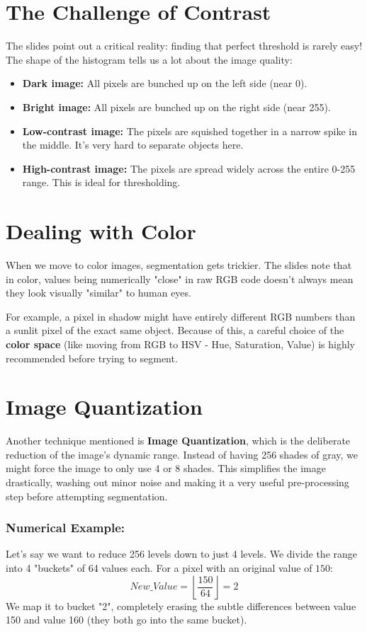 \documentclass{report}
\begin{document}
\section{The Challenge of Contrast}
The slides point out a critical reality: finding that perfect threshold is rarely easy! The shape of the histogram tells us a lot about the image quality:
\begin{itemize}
    \item \textbf{Dark image:} All pixels are bunched up on the left side (near 0).
    \item \textbf{Bright image:} All pixels are bunched up on the right side (near 255).
    \item \textbf{Low-contrast image:} The pixels are squished together in a narrow spike in the middle. It's very hard to separate objects here.
    \item \textbf{High-contrast image:} The pixels are spread widely across the entire 0-255 range. This is ideal for thresholding.
\end{itemize}

\section{Dealing with Color}
When we move to color images, segmentation gets trickier. The slides note that in color, values being numerically "close" in raw RGB code doesn't always mean they look visually "similar" to human eyes.

For example, a pixel in shadow might have entirely different RGB numbers than a sunlit pixel of the exact same object. Because of this, a careful choice of the \textbf{color space} (like moving from RGB to HSV - Hue, Saturation, Value) is highly recommended before trying to segment.

\section{Image Quantization}
Another technique mentioned is \textbf{Image Quantization}, which is the deliberate reduction of the image's dynamic range. Instead of having 256 shades of gray, we might force the image to only use 4 or 8 shades. This simplifies the image drastically, washing out minor noise and making it a very useful pre-processing step before attempting segmentation.

\subsubsection{Numerical Example:}
Let's say we want to reduce 256 levels down to just 4 levels. We divide the range into 4 "buckets" of 64 values each.
For a pixel with an original value of $150$:
\[ New\_Value = \left\lfloor \frac{150}{64} \right\rfloor = 2 \]
We map it to bucket "2", completely erasing the subtle differences between value 150 and value 160 (they both go into the same bucket).
\end{document}
